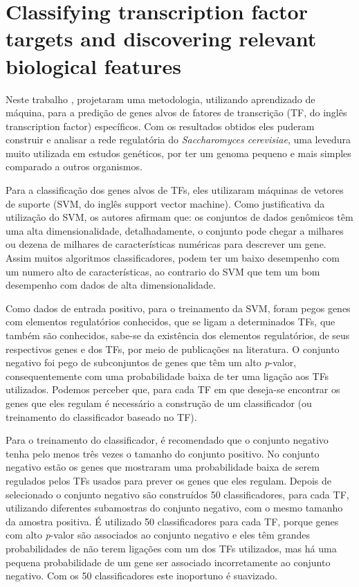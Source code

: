 


\section{Classifying transcription factor targets and discovering relevant biological features \cite{Holloway2008}}

Neste trabalho \cite{Holloway2008}, projetaram uma metodologia, utilizando aprendizado de máquina, para a predição de genes alvos de fatores de transcrição (TF, do inglês transcription factor) específicos. Com os resultados obtidos eles puderam construir e analisar a rede regulatória do \textit{Saccharomyces cerevisiae}, uma levedura muito utilizada em estudos genéticos, por ter um genoma pequeno e mais simples comparado a outros organismos.

Para a classificação dos genes alvos de TFs, eles utilizaram máquinas de vetores de suporte (SVM, do inglês support vector machine). Como justificativa da utilização do SVM, os autores afirmam que: os conjuntos de dados genômicos têm uma alta dimensionalidade, detalhadamente, o conjunto pode chegar a milhares ou dezena de milhares de características numéricas para descrever um gene. Assim muitos algoritmos classificadores, podem ter um baixo desempenho com um numero alto de características, ao contrario do SVM que tem um bom desempenho com dados de alta dimensionalidade.

Como dados de entrada positivo, para o treinamento da SVM, foram pegos genes com elementos regulatórios conhecidos, que se ligam a determinados TFs, que também são conhecidos, sabe-se da existência dos elementos regulatórios, de seus respectivos genes e dos TFs, por meio de publicações na literatura. O conjunto negativo foi pego de subconjuntos de genes que têm um alto \textit{p}-valor, consequentemente com uma probabilidade baixa de ter uma ligação aos TFs utilizados. Podemos perceber que, para cada TF em que deseja-se encontrar os genes que eles regulam é necessário a construção de um classificador (ou treinamento do classificador baseado no TF).


Para o treinamento do classificador, é recomendado que o conjunto negativo tenha pelo menos três vezes o tamanho do conjunto positivo. No conjunto negativo estão os genes que mostraram uma probabilidade baixa de serem regulados pelos TFs usados para prever os genes que eles regulam.  Depois de selecionado o conjunto negativo são construídos 50 classificadores, para cada TF, utilizando diferentes subamostras do conjunto negativo, com o mesmo tamanho da amostra positiva. É utilizado 50 classificadores para cada TF, porque genes com alto \textit{p}-valor são associados ao conjunto negativo e eles têm grandes probabilidades de não terem ligações com um dos TFs utilizados, mas há uma pequena probabilidade de um gene ser associado incorretamente ao conjunto negativo. Com os 50 classificadores este inoportuno é suavizado.


